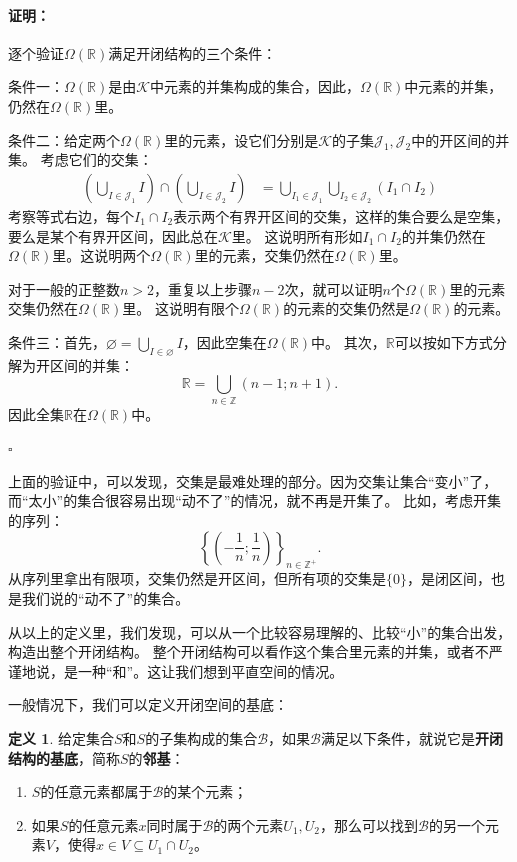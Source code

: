 \documentclass[12pt,UTF8]{ctexbook}
\theoremstyle{definition}
\newtheorem{df}{定义}[section]
\theoremstyle{plain}
\renewenvironment{proof}{\paragraph{\textbf{证明：}}}{\hfill$\square$}
\begin{document}
\begin{appendix}
\begin{proof}
    逐个验证$\Omega(\mathbb{R})$满足开闭结构的三个条件：

    条件一：$\Omega(\mathbb{R})$是由$\mathcal{K}$中元素的并集构成的集合，因此，$\Omega(\mathbb{R})$中元素的并集，仍然在$\Omega(\mathbb{R})$里。

    条件二：给定两个$\Omega(\mathbb{R})$里的元素，设它们分别是$\mathcal{K}$的子集$\mathcal{J}_1, \mathcal{J}_2$中的开区间的并集。
    考虑它们的交集：
    \begin{align*}
        \left(\bigcup_{I \in \mathcal{J}_1} I\right) \cap \left(\bigcup_{I \in \mathcal{J}_2} I\right) &= \bigcup_{I_1 \in \mathcal{J}_1} \bigcup_{I_2 \in \mathcal{J}_2} (I_1 \cap I_2)   
    \end{align*}
    考察等式右边，每个$I_1 \cap I_2$表示两个有界开区间的交集，这样的集合要么是空集，要么是某个有界开区间，因此总在$\mathcal{K}$里。
    这说明所有形如$I_1 \cap I_2$的并集仍然在$\Omega(\mathbb{R})$里。这说明两个$\Omega(\mathbb{R})$里的元素，交集仍然在$\Omega(\mathbb{R})$里。

    对于一般的正整数$n>2$，重复以上步骤$n-2$次，就可以证明$n$个$\Omega(\mathbb{R})$里的元素交集仍然在$\Omega(\mathbb{R})$里。
    这说明有限个$\Omega(\mathbb{R})$的元素的交集仍然是$\Omega(\mathbb{R})$的元素。

    条件三：首先，$\varnothing = \bigcup_{I \in \varnothing} I $，因此空集在$\Omega(\mathbb{R})$中。
    其次，$\mathbb{R}$可以按如下方式分解为开区间的并集：
    $$ \mathbb{R} = \bigcup_{n\in \mathbb{Z}} (n-1;n+1) . $$
    因此全集$\mathbb{R}$在$\Omega(\mathbb{R})$中。

\end{proof}

上面的验证中，可以发现，交集是最难处理的部分。因为交集让集合“变小”了，而“太小”的集合很容易出现“动不了”的情况，就不再是开集了。
比如，考虑开集的序列：
$$ \left\{ \left(-\frac{1}{n};\frac{1}{n}\right)\right\}_{n\in\mathbb{Z}^+}.$$
从序列里拿出有限项，交集仍然是开区间，但所有项的交集是$\{0\}$，是闭区间，也是我们说的“动不了”的集合。

从以上的定义里，我们发现，可以从一个比较容易理解的、比较“小”的集合出发，构造出整个开闭结构。
整个开闭结构可以看作这个集合里元素的并集，或者不严谨地说，是一种“和”。这让我们想到平直空间的情况。

一般情况下，我们可以定义开闭空间的基底：
\begin{df}
    给定集合$S$和$S$的子集构成的集合$\mathcal{B}$，如果$\mathcal{B}$满足以下条件，就说它是\textbf{开闭结构的基底}，简称$S$的\textbf{邻基}：
    \begin{enumerate}
        \item $S$的任意元素都属于$\mathcal{B}$的某个元素；
        \item 如果$S$的任意元素$x$同时属于$\mathcal{B}$的两个元素$U_1, U_2$，那么可以找到$\mathcal{B}$的另一个元素$V$，使得$x\in V\subseteq U_1\cap U_2$。
    \end{enumerate}
\end{df}


\end{appendix}
\end{document}
